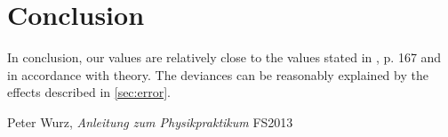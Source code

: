 \documentclass{scrreprt}
\begin{document}
\section{Conclusion}

In conclusion, our values are relatively close to the values stated in \cite{physcript13}, p. 167 and in accordance with theory. The deviances can be reasonably explained by the effects described in \ref{sec:error}.

\begin{thebibliography}{9}

  Peter Wurz,
  \emph{Anleitung zum Physikpraktikum}
  FS2013

\end{thebibliography}
\end{document}
